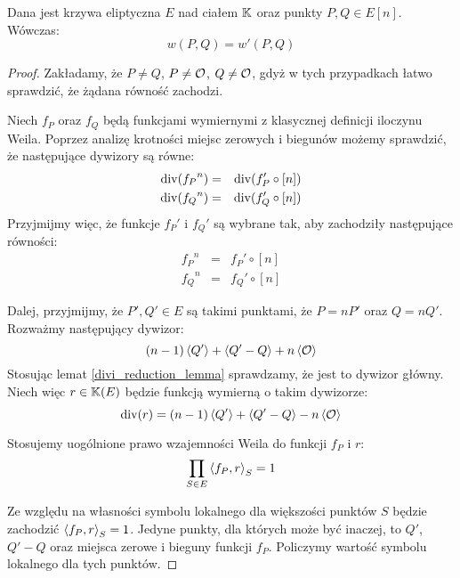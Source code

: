 \begin{theorem}
Dana jest krzywa eliptyczna $E$ nad ciałem $\mathbb{K}$
oraz punkty $P, Q \in E[n]$.
Wówczas:
\begin{equation}
w(P, Q) = w'(P, Q)
\end{equation}
\end{theorem}

\begin{proof}
Zakładamy, że $P \neq Q$, $P \neq \mathcal{O}$, $Q \neq \mathcal{O}$,
gdyż w tych przypadkach łatwo sprawdzić, że żądana równość zachodzi.

Niech $f_P$ oraz $f_Q$ będą funkcjami wymiernymi
z klasycznej definicji iloczynu Weila.
Poprzez analizę krotności miejsc zerowych i biegunów możemy sprawdzić,
że następujące dywizory są równe:
\begin{eqnarray*}
\operatorname{div}({f_P}^n) & = & \operatorname{div}(f_P' \circ [n]) \\
\operatorname{div}({f_Q}^n) & = & \operatorname{div}(f_Q' \circ [n])
\end{eqnarray*}
Przyjmijmy więc, że funkcje $f_P'$ i $f_Q'$ są wybrane tak,
aby zachodziły następujące równości:
\begin{eqnarray*}
{f_P}^n & = & f_P' \circ [n] \\
{f_Q}^n & = & f_Q' \circ [n]
\end{eqnarray*}

Dalej, przyjmijmy, że $P', Q' \in E$ są takimi punktami,
że $P = nP'$ oraz $Q = nQ'$.
Rozważmy następujący dywizor:
\begin{equation*}
(n-1)\left\langle Q'\right\rangle + \left\langle Q' - Q\right\rangle + n\left\langle\mathcal{O}\right\rangle
\end{equation*}
Stosując lemat \ref{divi_reduction_lemma} sprawdzamy,
że jest to dywizor główny.
Niech więc $r \in \mathbb{K}(E)$ będzie funkcją wymierną o takim dywizorze:
\begin{equation*}
\operatorname{div}(r) = (n-1)\left\langle Q'\right\rangle + \left\langle Q' - Q\right\rangle - n\left\langle\mathcal{O}\right\rangle
\end{equation*}

Stosujemy uogólnione prawo wzajemności Weila do funkcji $f_P$ i $r$:
\begin{equation}\label{weil_reci_fp_r}
\prod_{S \in E} \left\langle f_P , r \right\rangle_{S} = 1
\end{equation}

Ze względu na własności symbolu lokalnego dla większości punktów $S$
będzie zachodzić $\left\langle f_P , r \right\rangle_{S} = 1$.
Jedyne punkty, dla których może być inaczej,
to $Q'$, $Q' - Q$ oraz miejsca zerowe i bieguny funkcji $f_P$.
Policzymy wartość symbolu lokalnego dla tych punktów.


\end{proof}
